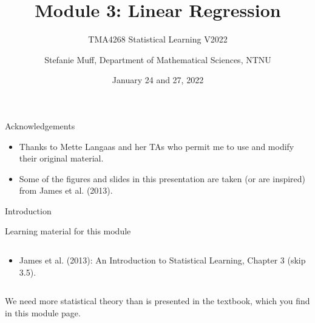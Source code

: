 \documentclass[10pt,ignorenonframetext,]{beamer}
\title{Module 3: Linear Regression}
\subtitle{TMA4268 Statistical Learning V2022}
\author{Stefanie Muff, Department of Mathematical Sciences, NTNU}
\date{January 24 and 27, 2022}
\providecommand{\tightlist}{%
  \setlength{\itemsep}{0pt}\setlength{\parskip}{0pt}}
\begin{document}
\frame{\titlepage}

\begin{frame}{Acknowledgements}
\protect\hypertarget{acknowledgements}{}

\begin{itemize}
\item
  Thanks to Mette Langaas and her TAs who permit me to use and modify
  their original material.
\item
  Some of the figures and slides in this presentation are taken (or are
  inspired) from James et al. (2013).
\end{itemize}

\end{frame}

\begin{frame}{Introduction}
\protect\hypertarget{introduction}{}

\begin{block}{Learning material for this module}

\(~\)

\begin{itemize}
\tightlist
\item
  James et al. (2013): An Introduction to Statistical Learning, Chapter
  3 (skip 3.5).
\end{itemize}

\(~\)

We need more statistical theory than is presented in the textbook, which
you find in this module page.

\end{block}

\end{frame}
\end{document}
